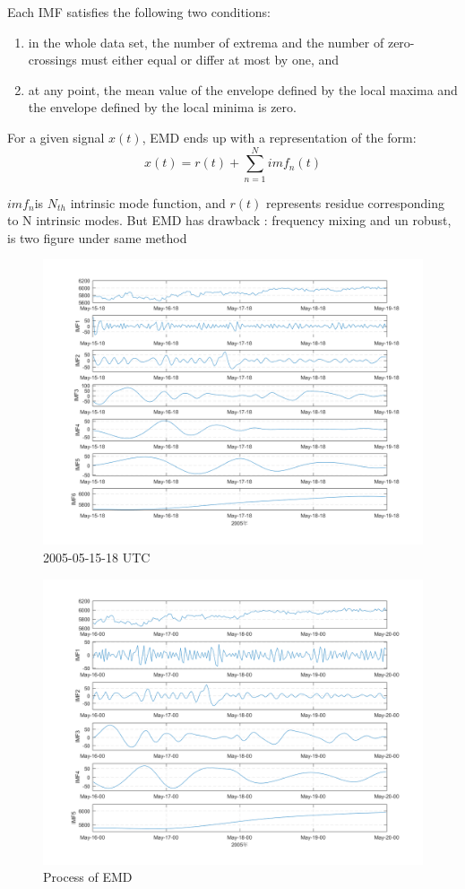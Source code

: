 \documentclass[draft]{agujournal2019}
\begin{document}
Each IMF satisfies the following two conditions: 
\begin{enumerate}
\item in the whole data set, the number of extrema and the number of zero-crossings must either equal or differ at most by one, and
\item at any point, the mean value of the envelope defined by the local maxima and the envelope defined by the local minima is zero.
\end{enumerate}

For a given signal \(x(t)\), EMD ends up with a representation of the form:
\[ x(t) = r(t) + \sum_{n=1}^N imf_n(t)\]

\(imf_n\)is \(N_{th}\) intrinsic mode function, and \(r(t)\) represents residue corresponding to N intrinsic modes. But EMD has drawback : frequency mixing and un robust, is two figure under same method  

\begin{figure}[h]
      \centering
      \includegraphics[width=350pt]{img//emd1.png}
      \caption{2005-05-15-18 UTC}\label{fig:3}
      \end{figure}

\begin{figure}[h]
      \centering
      \includegraphics[width=350pt]{img//emd2.png}
      \caption{Process of EMD}\label{fig:4}
      \end{figure}
      
\end{document}
